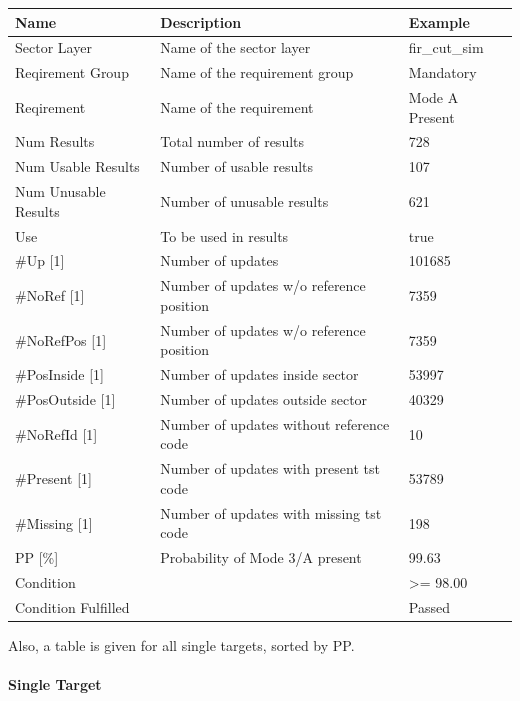 \begin{center}
 \begin{table}[H]
  \begin{tabularx}{\textwidth}{ | l | X |  l | }
    \hline
    \textbf{Name} & \textbf{Description} & \textbf{Example} \\ \hline
    Sector Layer & Name of the sector layer & fir\_cut\_sim \\ \hline
    Reqirement Group & Name of the requirement group & Mandatory \\ \hline
    Reqirement & Name of the requirement & Mode A Present \\ \hline
    Num Results & Total number of results & 728 \\ \hline
    Num Usable Results & Number of usable results & 107 \\ \hline
    Num Unusable Results & Number of unusable results & 621 \\ \hline
    Use & To be used in results & true \\ \hline
    \#Up [1] & Number of updates & 101685 \\ \hline
    \#NoRef [1] & Number of updates w/o reference position & 7359 \\ \hline
    \#NoRefPos [1] & Number of updates w/o reference position  & 7359 \\ \hline
    \#PosInside [1] & Number of updates inside sector & 53997 \\ \hline
    \#PosOutside [1] & Number of updates outside sector & 40329 \\ \hline
    \#NoRefId [1] & Number of updates without reference code & 10 \\ \hline
    \#Present [1] & Number of updates with present tst code & 53789 \\ \hline
    \#Missing [1] & Number of updates with missing tst code & 198 \\ \hline
    PP [\%] & Probability of Mode 3/A present & 99.63 \\ \hline
    Condition &  & >= 98.00 \\ \hline
    Condition Fulfilled &  & Passed \\ \hline
\end{tabularx}
\end{table}
\end{center}

Also, a table is given for all single targets, sorted by PP.

\paragraph{Single Target}

